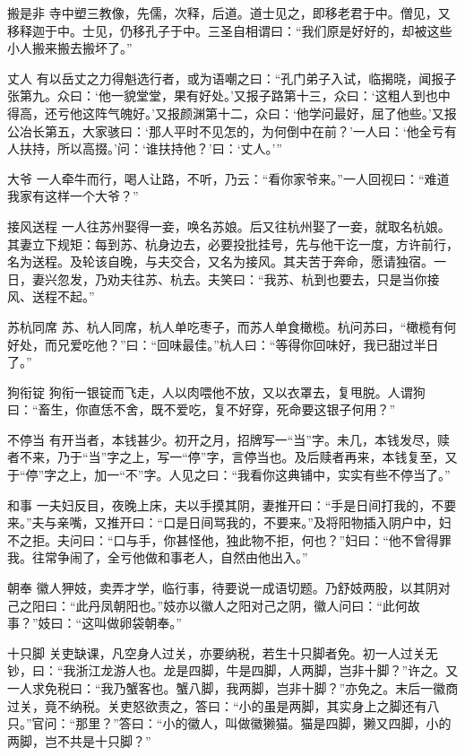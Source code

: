 \documentclass[12pt,UTF8]{ctexbook}
\begin{document}
搬是非
寺中塑三教像，先儒，次释，后道。道士见之，即移老君于中。僧见，又移释迦于中。士见，仍移孔子于中。三圣自相谓曰：“我们原是好好的，却被这些小人搬来搬去搬坏了。”

丈人
有以岳丈之力得魁选行者，或为语嘲之曰：“孔门弟子入试，临揭晓，闻报子张第九。众曰：‘他一貌堂堂，果有好处。’又报子路第十三，众曰：‘这粗人到也中得高，还亏他这阵气魄好。’又报颜渊第十二，众曰：‘他学问最好，屈了他些。’又报公冶长第五，大家骇曰：‘那人平时不见怎的，为何倒中在前？’一人曰：‘他全亏有人扶持，所以高掇。’问：‘谁扶持他？’曰：‘丈人。’”

大爷
一人牵牛而行，喝人让路，不听，乃云：“看你家爷来。”一人回视曰：“难道我家有这样一个大爷？”

接风送程
一人往苏州娶得一妾，唤名苏娘。后又往杭州娶了一妾，就取名杭娘。其妻立下规矩：每到苏、杭身边去，必要投批挂号，先与他干讫一度，方许前行，名为送程。及轮该自晚，与夫交合，又名为接风。其夫苦于奔命，愿请独宿。一日，妻兴忽发，乃劝夫往苏、杭去。夫笑曰：“我苏、杭到也要去，只是当你接风、送程不起。”

苏杭同席
苏、杭人同席，杭人单吃枣子，而苏人单食橄榄。杭问苏曰，“橄榄有何好处，而兄爱吃他？”曰：“回味最佳。”杭人曰：“等得你回味好，我已甜过半日了。”

狗衔锭
狗衔一银锭而飞走，人以肉喂他不放，又以衣罩去，复甩脱。人谓狗曰：“畜生，你直恁不舍，既不爱吃，复不好穿，死命要这银子何用？”

不停当
有开当者，本钱甚少。初开之月，招牌写一“当”字。未几，本钱发尽，赎者不来，乃于“当”字之上，写一“停”字，言停当也。及后赎者再来，本钱复至，又于“停”字之上，加一“不”字。人见之曰：“我看你这典铺中，实实有些不停当了。”

和事
一夫妇反目，夜晚上床，夫以手摸其阴，妻推开曰：“手是日间打我的，不要来。”夫与亲嘴，又推开曰：“口是日间骂我的，不要来。”及将阳物插入阴户中，妇不之拒。夫问曰：“口与手，你甚怪他，独此物不拒，何也？”妇曰：“他不曾得罪我。往常争闹了，全亏他做和事老人，自然由他出入。”

朝奉
徽人狎妓，卖弄才学，临行事，待要说一成语切题。乃舒妓两股，以其阴对己之阳曰：“此丹凤朝阳也。”妓亦以徽人之阳对己之阴，徽人问曰：“此何故事？”妓曰：“这叫做卵袋朝奉。”

十只脚
关吏缺课，凡空身人过关，亦要纳税，若生十只脚者免。初一人过关无钞，曰：“我浙江龙游人也。龙是四脚，牛是四脚，人两脚，岂非十脚？”许之。又一人求免税曰：“我乃蟹客也。蟹八脚，我两脚，岂非十脚？”亦免之。末后一徽商过关，竟不纳税。关吏怒欲责之，答曰：“小的虽是两脚，其实身上之脚还有八只。”官问：“那里？”答曰：“小的徽人，叫做徽獭猫。猫是四脚，獭又四脚，小的两脚，岂不共是十只脚？”
\end{document}
